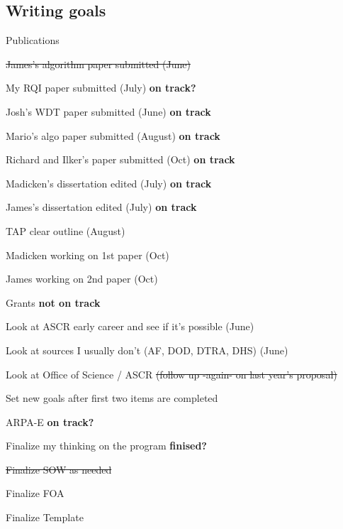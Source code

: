 \documentclass[12pt,twoside]{article}
\begin{document}
\subsection{Writing goals}
\begin{compactitem}
\item Publications
  \begin{compactitem}
  \item \st{James's algorithm paper submitted (June)}
  \item My RQI paper submitted (July) \textbf{on track?}
  \item Josh's WDT paper submitted (June) \textbf{on track}
  \item Mario's algo paper submitted (August) \textbf{on track}
  \item Richard and Ilker's paper submitted (Oct) \textbf{on track}
  \item Madicken's dissertation edited (July) \textbf{on track}
  \item James's dissertation edited (July) \textbf{on track}
  \item TAP clear outline (August) 
  \item Madicken working on 1st paper (Oct)
  \item James working on 2nd paper (Oct)
  \end{compactitem}

\item Grants \textbf{not on track}
  \begin{compactitem}
  \item Look at ASCR early career and see if it's possible (June) 
  \item Look at sources I usually don't (AF, DOD, DTRA, DHS) (June) 
  \item Look at Office of Science / ASCR \st{(follow up -again- on last year's proposal)}
  \item Set new goals after first two items are completed
  \end{compactitem}
 
\item ARPA-E \textbf{on track?}
  \begin{compactitem}
  \item Finalize my thinking on the program \textbf{finised?}
  \item \st{Finalize SOW as needed}
  \item Finalize FOA
  \item Finalize Template
  \end{compactitem}
\end{compactitem}
\end{document}

